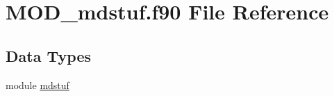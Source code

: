 \hypertarget{MOD__mdstuf_8f90}{\section{M\-O\-D\-\_\-mdstuf.\-f90 File Reference}
\label{MOD__mdstuf_8f90}
}
\subsection*{Data Types}
\begin{DoxyCompactItemize}
\item 
module \hyperlink{classmdstuf}{mdstuf}
\end{DoxyCompactItemize}
